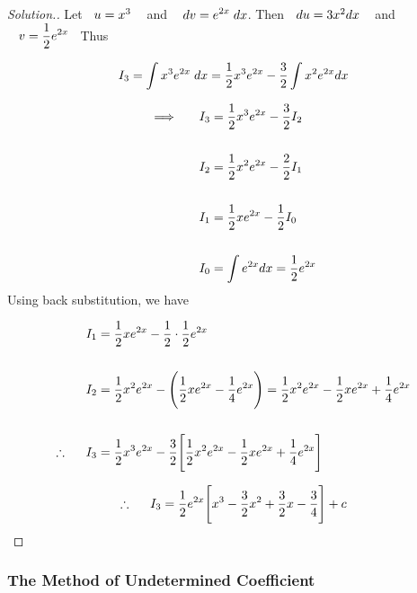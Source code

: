 \documentclass[11pt,a4paper]{article}
\theoremstyle{definition}
\newenvironment{solution}
  {\renewcommand{\qedsymbol}{}\begin{proof}[\textit{Solution}.]}
  {\end{proof}}
\begin{document}
\begin{solution}


Let $\hspace{0.2cm} u = x^3\hspace{0.3cm}$ and $\hspace{0.3cm} dv = \displaystyle{e^{2x}\hspace{0.1cm}dx}$. Then $\hspace{0.2cm} du = 3x^2dx\hspace{0.3cm}$ and $\hspace{0.3cm} v  = \displaystyle{\frac{1}{2}e^{2x}}\hspace{0.2cm}$ Thus

$$I_3 = \int x^3 e^{2x}\hspace{0.1cm}dx = \dfrac{1}{2}x^3e^{2x} - \dfrac{3}{2}\int x^2e^{2x}dx$$

\begin{align*}
\implies \hspace{0.5cm} I_3 & = \dfrac{1}{2}x^3e^{2x} - \dfrac{3}{2}I_2\\\\
I_2 & = \dfrac{1}{2}x^2e^{2x} - \dfrac{2}{2}I_1\\\\
I_1 & = \dfrac{1}{2}xe^{2x} - \dfrac{1}{2}I_0\\\\
I_0 & = \int e^{2x}dx = \dfrac{1}{2}e^{2x}
\end{align*}
Using back substitution, we have 

\begin{align*}
I_1 & = \dfrac{1}{2}xe^{2x} - \dfrac{1}{2}\cdot \dfrac{1}{2}e^{2x}\\\\
I_2 & = \dfrac{1}{2}x^2e^{2x} - \Bigg(\dfrac{1}{2}xe^{2x} - \dfrac{1}{4}e^{2x}\Bigg) =  \dfrac{1}{2}x^2e^{2x} - \dfrac{1}{2}xe^{2x} + \dfrac{1}{4}e^{2x}\\\\
\therefore \hspace{0.5cm} I_3 & = \dfrac{1}{2}x^3e^{2x} - \dfrac{3}{2}\Bigg[\dfrac{1}{2}x^2e^{2x} - \dfrac{1}{2}xe^{2x} + \dfrac{1}{4}e^{2x}\Bigg]\\
\end{align*}

$$\therefore\hspace{0.5cm} I_3 = \dfrac{1}{2}e^{2x} \Bigg[ x^3 - \dfrac{3}{2}x^2 + \dfrac{3}{2}x - \dfrac{3}{4}\Bigg] + c$$
\end{solution}


\subsubsection{The Method of Undetermined Coefficient}
\end{document}
